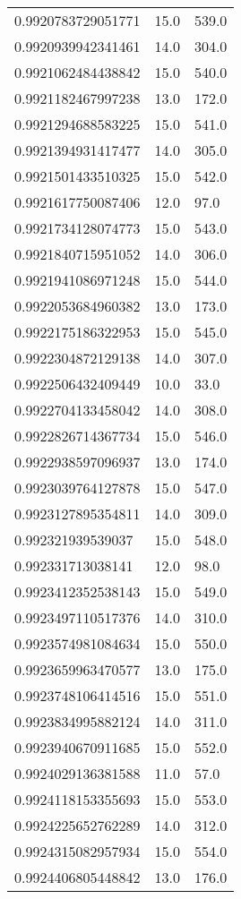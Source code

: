 \begin{center}
\begin{supertabular}[H]{p{0.30\textwidth}p{0.05\textwidth}p{0.05\textwidth}}
0.9920783729051771 & 15.0 & 539.0 \\ 
0.9920939942341461 & 14.0 & 304.0 \\ 
0.9921062484438842 & 15.0 & 540.0 \\ 
0.9921182467997238 & 13.0 & 172.0 \\ 
0.9921294688583225 & 15.0 & 541.0 \\ 
0.9921394931417477 & 14.0 & 305.0 \\ 
0.9921501433510325 & 15.0 & 542.0 \\ 
0.9921617750087406 & 12.0 & 97.0 \\ 
0.9921734128074773 & 15.0 & 543.0 \\ 
0.9921840715951052 & 14.0 & 306.0 \\ 
0.9921941086971248 & 15.0 & 544.0 \\ 
0.9922053684960382 & 13.0 & 173.0 \\ 
0.9922175186322953 & 15.0 & 545.0 \\ 
0.9922304872129138 & 14.0 & 307.0 \\ 
0.9922506432409449 & 10.0 & 33.0 \\ 
0.9922704133458042 & 14.0 & 308.0 \\ 
0.9922826714367734 & 15.0 & 546.0 \\ 
0.9922938597096937 & 13.0 & 174.0 \\ 
0.9923039764127878 & 15.0 & 547.0 \\ 
0.9923127895354811 & 14.0 & 309.0 \\ 
0.992321939539037 & 15.0 & 548.0 \\ 
0.992331713038141 & 12.0 & 98.0 \\ 
0.9923412352538143 & 15.0 & 549.0 \\ 
0.9923497110517376 & 14.0 & 310.0 \\ 
0.9923574981084634 & 15.0 & 550.0 \\ 
0.9923659963470577 & 13.0 & 175.0 \\ 
0.9923748106414516 & 15.0 & 551.0 \\ 
0.9923834995882124 & 14.0 & 311.0 \\ 
0.9923940670911685 & 15.0 & 552.0 \\ 
0.9924029136381588 & 11.0 & 57.0 \\ 
0.9924118153355693 & 15.0 & 553.0 \\ 
0.9924225652762289 & 14.0 & 312.0 \\ 
0.9924315082957934 & 15.0 & 554.0 \\ 
0.9924406805448842 & 13.0 & 176.0 \\ 

\end{supertabular}
\end{center}
